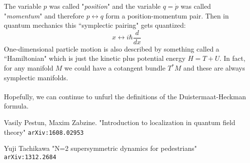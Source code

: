 \documentclass[12pt]{article}
\begin{document}
The variable $p$ was called "\textit{position}" and the variable $q = \dot{p}$ was called "\textit{momentum}" and therefore $p \leftrightarrow q$ form a position-momentum pair.  Then in quantum mechanics this ``symplectic pairing" gets quantized:
$$ x \leftrightarrow i\hbar\frac{d}{dx} $$
One-dimensional particle motion is also described by something called a ``Hamiltonian" which is just the kinetic plus potential energy $H = T + U$.  In fact, for any manifold $M$ we could have a cotangent bundle $T^\ast M$ and these are always symplectic manifolds.   \\ \\
Hopefully, we can continue to unfurl the definitions of the Duistermaat-Heckman formula.
\vfill

\begin{thebibliography}{}

\item Vasily Pestun, Maxim Zabzine. 
"Introduction to localization in quantum field theory" \texttt{arXiv:1608.02953}

\item Yuji Tachikawa "N=2 supersymmetric dynamics for pedestrians" \texttt{arXiv:1312.2684}
\end{thebibliography}
\end{document}
